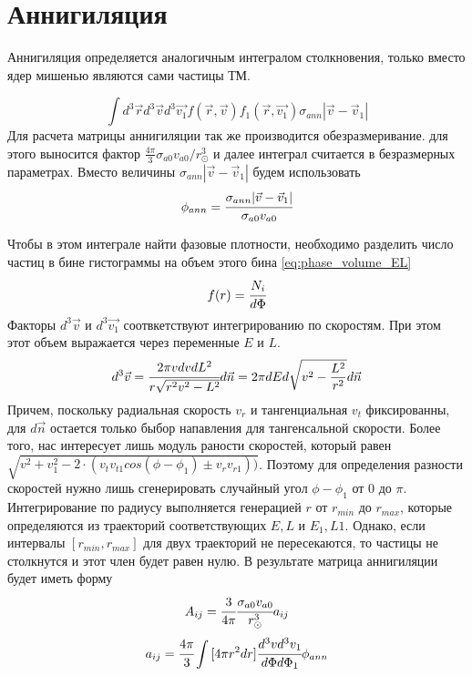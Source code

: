 \section{Аннигиляция}
Аннигиляция определяется аналогичным интегралом столкновения, только вместо ядер мишенью являются сами частицы ТМ. 

\begin{equation}
	\label{eq:ann_st}
	\int{d^3\vec{r} d^3\vec{v}  d^3\vec{v_1} 
		f(\vec{r},\vec{v})f_1(\vec{r},\vec{v_1}) \sigma_{ann} 
		|\vec{v}-\vec{v}_1|}
\end{equation}
Для расчета матрицы аннигиляции так же производится обезразмеривание. для этого выносится фактор $\frac{4\pi}{3}\sigma_{a0}v_{a0}/r_{\odot}^3$ и далее интеграл считается в безразмерных параметрах. Вместо величины $ \sigma_{ann} 
|\vec{v}-\vec{v}_1|$ будем использовать 
\begin{equation}
	\phi_{ann} = \cfrac{\sigma_{ann} |\vec{v}-\vec{v}_1| }{\sigma_{a0}  v_{a0}}
\end{equation}

Чтобы в этом интеграле найти фазовые плотности, необходимо разделить число частиц в бине гистограммы на объем этого бина \ref{eq:phase_volume_EL}
\begin{equation}
	\label{eq:phase_dens}
	f(r) = \cfrac{N_i}{d\Phi}
\end{equation}
Факторы $d^3\vec{v}$ и $d^3\vec{v_1}$ соотвкетствуют интегрированию по скоростям. При этом этот объем выражается через переменные $E$ и $L$.
\begin{equation}
	\label{eq:velocity_dens}
	d^{3}\vec{v} = \cfrac{2\pi vdvdL^{2}}{r\sqrt{r^{2}v^{2} - L^{2}}} d\vec{n} = 
	2\pi dEd\sqrt{v^2-\frac{L^2}{r^2}} d\vec{n}
\end{equation}
Причем, поскольку радиальная скорость $v_r$ и тангенциальная $v_{t}$ фиксированны, для $d\vec{n}$ остается только быбор напавления для тангенсальной скорости. Более того, нас интересует лишь модуль раности скоростей, который равен $\sqrt{v^2 + v_{1}^2 - 2\cdot
(v_{t}v_{t1} cos(\phi-\phi_1) \pm v_{r}v_{r1}))}$. Поэтому для определения разности скоростей нужно лишь сгенерировать случайный угол $\phi-\phi_1$ от $0$ до $\pi$.
Интегрирование по радиусу выполняется генерацией $r$ от $r_{min}$ до $r_{max}$, которые определяются из траекторий соответствующих $E, L$ и $E_1, L1$. Однако, если интервалы $[r_{min}, r_{max}]$ для двух траекторий не пересекаются, то частицы не столкнутся и этот член будет равен нулю.
В результате матрица аннигиляции будет иметь форму
\begin{equation}
	\label{eq:ANN_full}
	A_{ij} = \cfrac{3}{4\pi}\cfrac{\sigma_{a0} v_{a0}}{r_{\odot}^3} a_{ij}
\end{equation}
\begin{equation}
	\label{eq:ann_detail}
	a_{ij} =\cfrac{4\pi}{3} \int{[4\pi r^2dr] \cfrac{d^3vd^3v_1}{d\Phi d\Phi_1}} \phi_{ann}
\end{equation}

